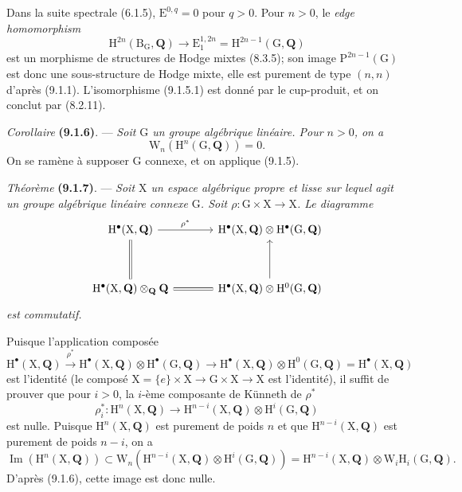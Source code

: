\documentclass[11pt,leqno]{article}
\newcommand{\Page}[1]{\ifvmode\noindent\else\unskip\ \fi{\footnotesize\textcolor{gray}{[p.\,#1]}}\ \ignorespaces}
\begin{document}
Dans la suite spectrale (6.1.5), \(\mathrm{E}^{0,q}=0\) pour \(q>0\). Pour \(n>0\), le \textit{edge homomorphism}
\[
\mathrm{H}^{2n}(\mathrm{B}_{\mathrm{G}},\mathbf{Q})
\to\mathrm{E}_{1}^{1,2n}
=\mathrm{H}^{2n-1}(\mathrm{G},\mathbf{Q})
\]
est un morphisme de structures de Hodge mixtes (8.3.5); son image \(\mathrm{P}^{2n-1}(\mathrm{G})\) est donc une sous-structure de Hodge mixte, elle est purement de type \((n,n)\) d’après (9.1.1). L’isomorphisme (9.1.5.1) est donné par le cup-produit, et on conclut par (8.2.11).

\textit{Corollaire} \textbf{(9.1.6)}. — \textit{Soit \(\mathrm{G}\) un groupe algébrique linéaire. Pour \(n>0\), on a}
\[
\mathrm{W}_{n}(\mathrm{H}^{n}(\mathrm{G},\mathbf{Q}))=0.
\]
On se ramène à supposer \(\mathrm{G}\) connexe, et on applique (9.1.5).

\textit{Théorème} \textbf{(9.1.7)}. — \textit{Soit \(\mathrm{X}\) un espace algébrique propre et lisse sur lequel agit un groupe algébrique linéaire connexe \(\mathrm{G}\). Soit \(\rho:\mathrm{G}\times\mathrm{X}\to\mathrm{X}\). Le diagramme}
\Page{47}
\[
\begin{tikzcd}[ampersand replacement=\&, column sep=large, row sep=3.5em]
\mathrm{H}^{\bullet}(\mathrm{X},\mathbf{Q})
  \arrow[r, "\rho^{*}"] \arrow[d, equal]
\&
\mathrm{H}^{\bullet}(\mathrm{X},\mathbf{Q})\otimes
\mathrm{H}^{\bullet}(\mathrm{G},\mathbf{Q})
\\
\mathrm{H}^{\bullet}(\mathrm{X},\mathbf{Q})\otimes_{\mathbf{Q}}\mathbf{Q}
  \arrow[r, equal]
\&
\mathrm{H}^{\bullet}(\mathrm{X},\mathbf{Q})\otimes
\mathrm{H}^{0}(\mathrm{G},\mathbf{Q})
  \arrow[u]
\end{tikzcd}
\]
\textit{est commutatif.}

Puisque l’application composée
\[
\mathrm{H}^{\bullet}(\mathrm{X},\mathbf{Q})
\xrightarrow{\rho^{*}}
\mathrm{H}^{\bullet}(\mathrm{X},\mathbf{Q})\otimes\mathrm{H}^{\bullet}(\mathrm{G},\mathbf{Q})
\to
\mathrm{H}^{\bullet}(\mathrm{X},\mathbf{Q})\otimes\mathrm{H}^{0}(\mathrm{G},\mathbf{Q})
=\mathrm{H}^{\bullet}(\mathrm{X},\mathbf{Q})
\]
est l’identité (le composé \(\mathrm{X}=\{e\}\times\mathrm{X}\to\mathrm{G}\times\mathrm{X}\to\mathrm{X}\) est l’identité), il suffit de prouver que pour \(i>0\), la \(i\)-ème composante de Künneth de \(\rho^{*}\)
\[
\rho_{i}^{*}:\mathrm{H}^{n}(\mathrm{X},\mathbf{Q})
\to
\mathrm{H}^{n-i}(\mathrm{X},\mathbf{Q})\otimes\mathrm{H}^{i}(\mathrm{G},\mathbf{Q})
\]
est nulle. Puisque \(\mathrm{H}^{n}(\mathrm{X},\mathbf{Q})\) est purement de poids \(n\) et que \(\mathrm{H}^{n-i}(\mathrm{X},\mathbf{Q})\) est purement de poids \(n-i\), on a
\[
\operatorname{Im}(\mathrm{H}^{n}(\mathrm{X},\mathbf{Q}))
\subset
\mathrm{W}_{n}(\mathrm{H}^{n-i}(\mathrm{X},\mathbf{Q})\otimes\mathrm{H}^{i}(\mathrm{G},\mathbf{Q}))
=
\mathrm{H}^{n-i}(\mathrm{X},\mathbf{Q})\otimes\mathrm{W}_{i}\mathrm{H}_{i}(\mathrm{G},\mathbf{Q}).
\]
D’après (9.1.6), cette image est donc nulle.
\end{document}
